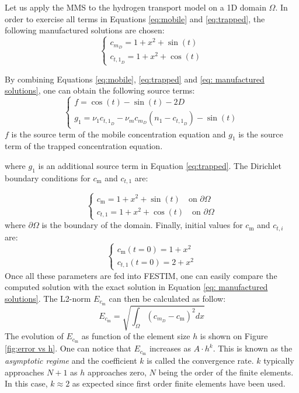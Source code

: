 Let us apply the MMS to the hydrogen transport model on a 1D domain $\Omega$.
In order to exercise all terms in Equations \ref{eq:mobile} and \ref{eq:trapped}, the following manufactured solutions are chosen:
\begin{equation}
    \begin{cases}
    c_{m_D} = 1 + x^2 + \sin(t) \\
    c_{{t,1}_D} = 1 + x^2 + \cos(t)
    \end{cases}
    \label{eq: manufactured solutions}
\end{equation}

By combining Equations \ref{eq:mobile}, \ref{eq:trapped} and \ref{eq: manufactured solutions}, one can obtain the following source terms:
\begin{equation}
    \begin{cases}
    f = \cos(t) - \sin(t) - 2D \\
    g_1 = \nu_1 c_{{t,1}_D} - \nu_m c_{m_D} ( n_1 - c_{{t,1}_D}) - \sin(t)
    \end{cases}
    \label{eq:sources}
\end{equation}
$f$ is the source term of the mobile concentration equation and $g_1$ is the source term of the trapped concentration equation.

where $g_1$ is an additional source term in Equation \ref{eq:trapped}.
The Dirichlet boundary conditions for $c_\mathrm{m}$ and $c_{t,1}$ are:

\begin{equation}
    \begin{cases}
    c_\mathrm{m} = 1 + x^2 + \sin(t) \quad \text{on } \partial \Omega \\
    c_{t,1} = 1 + x^2 + \cos(t) \quad \text{on } \partial \Omega 
    \end{cases}
\end{equation}
where $\partial\Omega$ is the boundary of the domain.
Finally, initial values for $c_\mathrm{m}$ and $c_{t,i}$ are:
\begin{equation}
    \begin{cases}
    c_\mathrm{m}(t=0) = 1 + x^2 \\
    c_{t,1}(t=0) = 2 + x^2
    \end{cases}
\end{equation}
Once all these parameters are fed into FESTIM, one can easily compare the computed solution with the exact solution in Equation \ref{eq: manufactured solutions}.
The L2-norm $E_{c_\mathrm{m}}$ can then be calculated as follow:
\begin{equation}
    E_{c_\mathrm{m}} = \sqrt{\int_\Omega(c_{m_D} - c_\mathrm{m})^2dx}
\end{equation}
The evolution of $E_{c_\mathrm{m}}$ as function of the element size $h$ is shown on Figure \ref{fig:error vs h}.
One can notice that $E_{c_\mathrm{m}}$ increases as $A\cdot h^k$.
This is known as the \textit{asymptotic regime} and the coefficient $k$ is called the convergence rate.
$k$ typically approaches $N+1$ as $h$ approaches zero, $N$ being the order of the finite elements.
In this case, $k \approx 2$ as expected since first order finite elements have been used.


